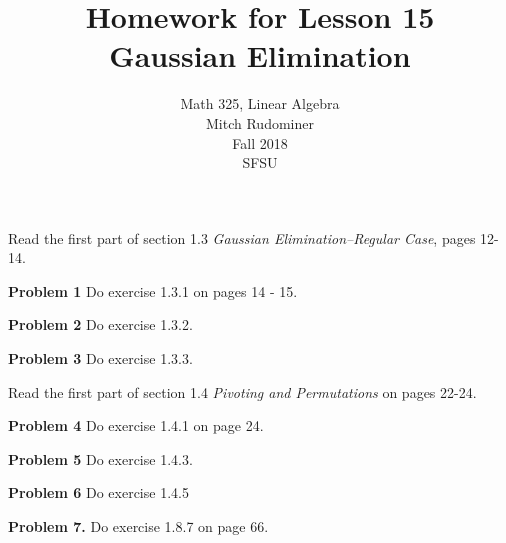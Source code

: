 \documentclass[oneside,12pt]{amsart}
\begin{document}
\title{Homework for Lesson 15 \\ Gaussian Elimination}
\author{Math 325, Linear Algebra \\ Mitch Rudominer \\ Fall 2018 \\ SFSU }
\date{}

\maketitle

\bigskip

Read the first part of section 1.3 \emph{Gaussian Elimination--Regular Case}, pages 12-14.

\textbf{Problem 1} Do exercise 1.3.1 on pages 14 - 15.

\bigskip
\bigskip
\bigskip
\bigskip

\textbf{Problem 2} Do exercise 1.3.2.

\bigskip
\bigskip
\bigskip
\bigskip


\textbf{Problem 3} Do exercise 1.3.3.

\bigskip
\bigskip
\bigskip
\bigskip


Read the first part of section 1.4 \emph{Pivoting and Permutations} on pages 22-24.

\medskip

\textbf{Problem 4} Do exercise 1.4.1 on page 24.

\bigskip
\bigskip
\bigskip
\bigskip

\textbf{Problem 5} Do exercise 1.4.3.

\bigskip
\bigskip
\bigskip
\bigskip

\textbf{Problem 6} Do exercise 1.4.5

\bigskip
\bigskip
\bigskip
\bigskip


\textbf{Problem 7.} Do exercise 1.8.7 on page 66.
\end{document}
